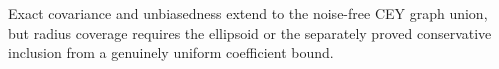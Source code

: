 Exact covariance and unbiasedness extend to the noise-free CEY graph union, but radius coverage requires the ellipsoid or the separately proved conservative inclusion from a genuinely uniform coefficient bound.